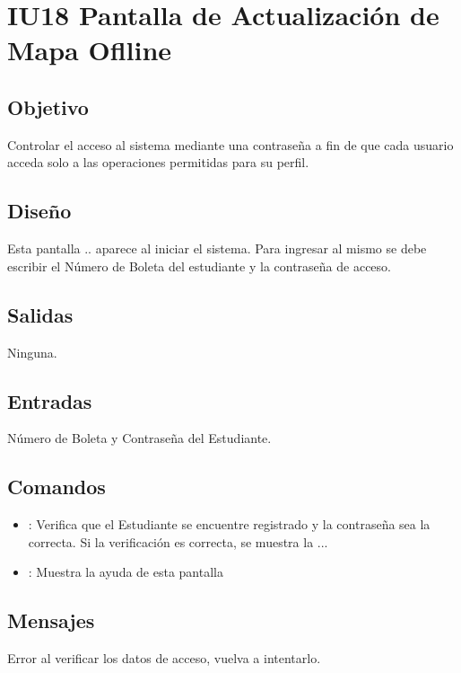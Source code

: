 \section{IU18 Pantalla de Actualización de Mapa Oflline}

\subsection{Objetivo}
	Controlar el acceso al sistema mediante una contraseña a fin de que cada usuario acceda solo a las operaciones permitidas para su perfil.

\subsection{Diseño}
	Esta pantalla .. aparece al iniciar el sistema. Para ingresar al mismo se debe escribir el Número de Boleta del estudiante y la contraseña de acceso. 

\subsection{Salidas}

	Ninguna.

\subsection{Entradas}
Número de Boleta y Contraseña del Estudiante.

\subsection{Comandos}
\begin{itemize}
	\item {}: Verifica que el Estudiante se encuentre registrado y la contraseña sea la correcta. Si la verificación es correcta, se muestra la ...
	\item {}: Muestra la ayuda de esta pantalla %
\end{itemize}

\subsection{Mensajes}

\begin{Citemize}
	\item Error al verificar los datos de acceso, vuelva a intentarlo.
\end{Citemize}

\clearpage